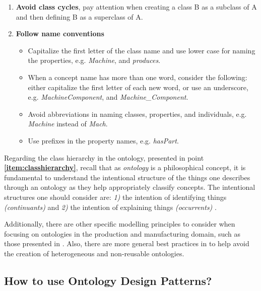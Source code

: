 \documentclass{guideline/sty/rapport}
\begin{document}
\begin{enumerate}
    \item \textbf{Avoid class cycles}, pay attention when creating a class B as a subclass of A and then defining B as a superclass of A.
    \item \textbf{Follow name conventions}
    \begin{itemize}
        \item Capitalize the first letter of the class name and use lower case for naming the properties, e.g. \textit{Machine}, and \textit{produces}.
        \item When a concept name has more than one word, consider the following: either capitalize the first letter of each new word, or use an underscore, e.g. \textit{MachineComponent}, and \textit{Machine\_Component}.
        \item Avoid abbreviations in naming classes, properties, and individuals, e.g. \textit{Machine} instead of \textit{Mach}.
        \item Use prefixes in the property names, e.g. \textit{hasPart}.
    \end{itemize}
\end{enumerate} \singlespacing

\begin{beware} [Remark]
Regarding the class hierarchy in the ontology, presented in point \textbf{\ref{item:classhierarchy}}, recall that as \textit{ontology} is a philosophical concept, it is fundamental to understand the intentional structure of the things one describes through an ontology as they help appropriately classify concepts. The intentional structures one should consider are: \textit{1)} the intention of identifying things \textit{(continuants)} and \textit{2)} the intention of explaining things \textit{(occurrents)} \cite{Neuenschwander22}.\singlespacing
\end{beware}

\begin{beware}[Remark]
Additionally, there are other specific modelling principles to consider when focusing on ontologies in the production and manufacturing domain, such as those presented in \cite{BedenCao21,Psarommatis22,Zhou21}. Also, there are more general best practices in \cite{Rudnicki16} to help avoid the creation of heterogeneous and non-reusable ontologies. 
\end{beware}


\subsection*{How to use Ontology Design Patterns?}
\end{document}
